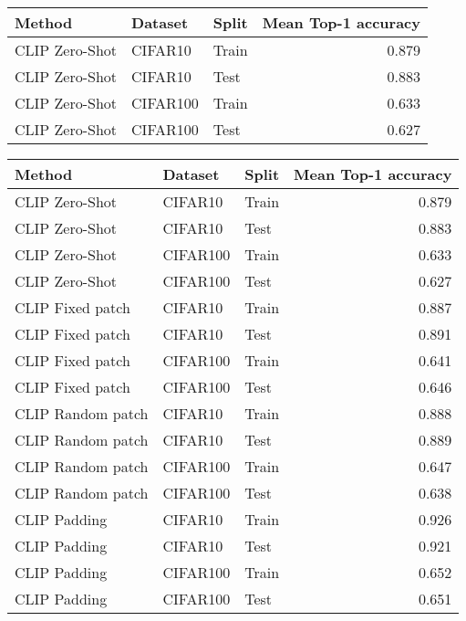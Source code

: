 \documentclass[11pt]{article}
\author{Marco A. Gallo}
\date{\today}
\title{}
\begin{document}
\tableofcontents

\begin{center}
\begin{tabular}{lllr}
Method & Dataset & Split & Mean Top-1 accuracy\\
\hline
CLIP Zero-Shot & CIFAR10 & Train & 0.879\\
CLIP Zero-Shot & CIFAR10 & Test & 0.883\\
CLIP Zero-Shot & CIFAR100 & Train & 0.633\\
CLIP Zero-Shot & CIFAR100 & Test & 0.627\\
\end{tabular}
\end{center}


\begin{center}
\begin{tabular}{lllr}
Method & Dataset & Split & Mean Top-1 accuracy\\
\hline
CLIP Zero-Shot & CIFAR10 & Train & 0.879\\
CLIP Zero-Shot & CIFAR10 & Test & 0.883\\
CLIP Zero-Shot & CIFAR100 & Train & 0.633\\
CLIP Zero-Shot & CIFAR100 & Test & 0.627\\
CLIP Fixed patch & CIFAR10 & Train & 0.887\\
CLIP Fixed patch & CIFAR10 & Test & 0.891\\
CLIP Fixed patch & CIFAR100 & Train & 0.641\\
CLIP Fixed patch & CIFAR100 & Test & 0.646\\
CLIP Random patch & CIFAR10 & Train & 0.888\\
CLIP Random patch & CIFAR10 & Test & 0.889\\
CLIP Random patch & CIFAR100 & Train & 0.647\\
CLIP Random patch & CIFAR100 & Test & 0.638\\
CLIP Padding & CIFAR10 & Train & 0.926\\
CLIP Padding & CIFAR10 & Test & 0.921\\
CLIP Padding & CIFAR100 & Train & 0.652\\
CLIP Padding & CIFAR100 & Test & 0.651\\
\end{tabular}
\end{center}
\end{document}
